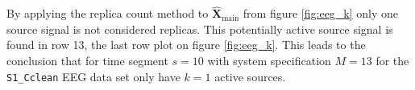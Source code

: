 By applying the replica count method to $\hat{\mathbf{X}}_{\text{main}}$  from figure \ref{fig:eeg_k} only one source signal is not considered replicas. 
This potentially active source signal is found in row 13, the last row plot on figure \ref{fig:eeg_k}. 
This leads to the conclusion that for time segment $s = 10$ with system specification $M = 13$ for the \texttt{S1\_Cclean} EEG data set only have $k = 1$ active sources. 



